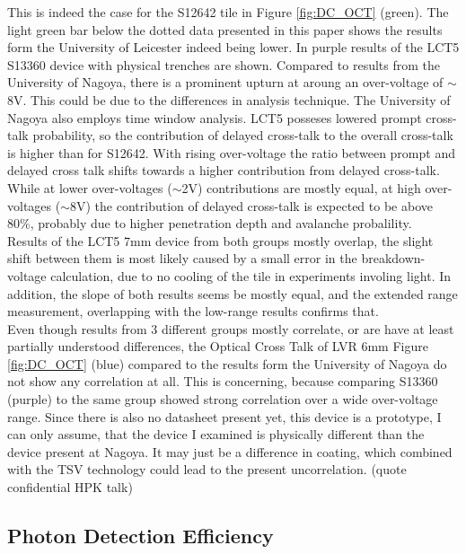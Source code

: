 \documentclass[12pt,article,type=msc,colorback,accentcolor=tud9c]{tudthesis}
\begin{document}
This is indeed the case for the S12642 tile in Figure \ref{fig:DC_OCT} (green). The light green bar below the dotted data presented in this paper shows the results form the University of Leicester indeed being lower. In purple results of the LCT5 S13360 device with physical trenches are shown. Compared to results from the University of Nagoya, there is a prominent upturn at aroung an over-voltage of $\sim$8V. This could be due to the differences in analysis technique. The University of Nagoya also employs time window analysis. LCT5 posseses lowered prompt cross-talk probability, so the contribution of delayed cross-talk to the overall cross-talk is higher than for S12642. With rising over-voltage the ratio between prompt and delayed cross talk shifts towards a higher contribution from delayed cross-talk. While at lower over-voltages ($\sim$2V) contributions are mostly equal, at high over-voltages ($\sim$8V) the contribution of delayed cross-talk is expected to be above 80\%, probably due to higher penetration depth and avalanche probalility.\\
Results of the LCT5 7mm device from both groups mostly overlap, the slight shift between them is most likely caused by a small error in the breakdown-voltage calculation, due to no cooling of the tile in experiments involing light. In addition, the slope of both results seems be mostly equal, and the extended range measurement, overlapping with the low-range results confirms that.\\
Even though results from 3 different groups mostly correlate, or are have at least partially understood differences, the Optical Cross Talk of LVR 6mm Figure \ref{fig:DC_OCT} (blue) compared to the results form the University of Nagoya do not show any correlation at all. This is concerning, because comparing S13360 (purple) to the same group showed strong correlation over a wide over-voltage range. Since there is also no datasheet present yet, this device is a prototype, I can only assume, that the device I examined is physically different than the device present at Nagoya. It may just be a difference in coating, which combined with the TSV technology could lead to the present uncorrelation. (quote confidential HPK talk)



\subsection{Photon Detection Efficiency}
\end{document}
